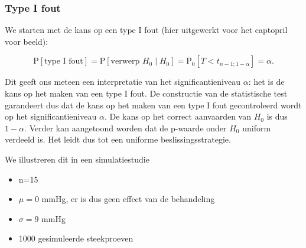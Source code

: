 \documentclass[
  12pt,dutch,coursenotes]{book}
\newenvironment{Shaded}{\begin{snugshade}}{\end{snugshade}}
\newcommand{\CommentTok}[1]{\textcolor[rgb]{0.56,0.35,0.01}{\textit{#1}}}
\newcommand{\ControlFlowTok}[1]{\textcolor[rgb]{0.13,0.29,0.53}{\textbf{#1}}}
\newcommand{\DataTypeTok}[1]{\textcolor[rgb]{0.13,0.29,0.53}{#1}}
\newcommand{\DecValTok}[1]{\textcolor[rgb]{0.00,0.00,0.81}{#1}}
\newcommand{\FloatTok}[1]{\textcolor[rgb]{0.00,0.00,0.81}{#1}}
\newcommand{\KeywordTok}[1]{\textcolor[rgb]{0.13,0.29,0.53}{\textbf{#1}}}
\newcommand{\NormalTok}[1]{#1}
\newcommand{\OperatorTok}[1]{\textcolor[rgb]{0.81,0.36,0.00}{\textbf{#1}}}
\newcommand{\StringTok}[1]{\textcolor[rgb]{0.31,0.60,0.02}{#1}}
\providecommand{\tightlist}{%
  \setlength{\itemsep}{0pt}\setlength{\parskip}{0pt}}
\theoremstyle{definition}
\theoremstyle{definition}
\theoremstyle{definition}
\theoremstyle{remark}
\begin{document}
\hypertarget{type-i-fout}{%
\subsubsection{Type I fout}\label{type-i-fout}}

We starten met de kans op een type I fout (hier uitgewerkt voor het captopril voor beeld):

\[\text{P}\left[\text{type I fout}\right]=\text{P}\left[\text{verwerp }H_0 \mid H_0\right] = \text{P}_0\left[T<t_{n-1;1-\alpha}\right]=\alpha.\]

Dit geeft ons meteen een interpretatie van het significantieniveau \(\alpha\): het is de kans op het maken van een type I fout. De constructie van de statistische test garandeert dus dat de kans op het maken van een type I fout gecontroleerd wordt op het significantieniveau \(\alpha\). De kans op het correct aanvaarden van \(H_0\) is dus \(1-\alpha\).
Verder kan aangetoond worden dat de p-waarde onder \(H_0\) uniform verdeeld is. Het leidt dus tot een uniforme beslissingsstrategie.

We illustreren dit in een simulatiestudie

\begin{itemize}
\tightlist
\item
  n=15
\item
  \(\mu=0\) mmHg, er is dus geen effect van de behandeling
\item
  \(\sigma =9\) mmHg
\item
  1000 gesimuleerde steekproeven
\end{itemize}

\begin{Shaded}
\end{Shaded}
\end{document}
